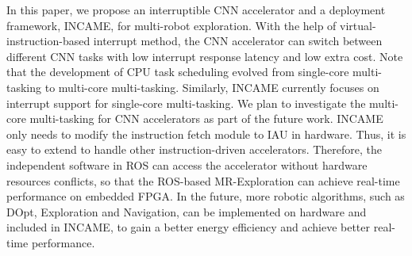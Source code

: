 \label{sec:conclusion}

In this paper, we propose an interruptible CNN accelerator and a deployment framework, INCAME, for multi-robot exploration. 
With the help of virtual-instruction-based interrupt method, the CNN accelerator can switch between different CNN tasks with low interrupt response latency and low extra cost. Note that the development of CPU task scheduling evolved from single-core multi-tasking to multi-core multi-tasking. Similarly, INCAME currently focuses on interrupt support for single-core multi-tasking. We plan to investigate the multi-core multi-tasking for CNN accelerators as part of the future work.
INCAME only needs to modify the instruction fetch module to IAU in hardware. Thus, it is easy to extend to handle other instruction-driven accelerators.
Therefore, the independent software in ROS can access the accelerator without hardware resources conflicts, so that the ROS-based MR-Exploration can achieve real-time performance on embedded FPGA. In the future, more robotic algorithms, such as DOpt, Exploration and Navigation, can be implemented on hardware and included in INCAME, to gain a better energy efficiency and achieve better real-time performance.

